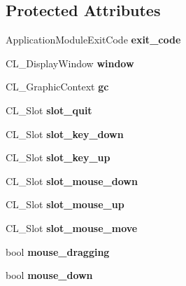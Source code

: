 \subsection*{Protected Attributes}
\begin{DoxyCompactItemize}
\item 
\hypertarget{classApplicationModule_a148d32ab67b53a89631ca60514dac4a6}{
ApplicationModuleExitCode {\bfseries exit\_\-code}}
\label{classApplicationModule_a148d32ab67b53a89631ca60514dac4a6}

\item 
\hypertarget{classApplicationModule_acf67b00ada6051624eab16d1594447e4}{
CL\_\-DisplayWindow {\bfseries window}}
\label{classApplicationModule_acf67b00ada6051624eab16d1594447e4}

\item 
\hypertarget{classApplicationModule_a847a964b766c02650275136054fbf2cf}{
CL\_\-GraphicContext {\bfseries gc}}
\label{classApplicationModule_a847a964b766c02650275136054fbf2cf}

\item 
\hypertarget{classApplicationModule_aeb1efd5a0360aa4b0b631f0ecd73782e}{
CL\_\-Slot {\bfseries slot\_\-quit}}
\label{classApplicationModule_aeb1efd5a0360aa4b0b631f0ecd73782e}

\item 
\hypertarget{classApplicationModule_ae1ec82a52e36716d11cf1ac25d4e81ac}{
CL\_\-Slot {\bfseries slot\_\-key\_\-down}}
\label{classApplicationModule_ae1ec82a52e36716d11cf1ac25d4e81ac}

\item 
\hypertarget{classApplicationModule_a7982a5f4dc5cc214a68646a545df3ea9}{
CL\_\-Slot {\bfseries slot\_\-key\_\-up}}
\label{classApplicationModule_a7982a5f4dc5cc214a68646a545df3ea9}

\item 
\hypertarget{classApplicationModule_aed41a09f76c702164b8f8ebdae86f830}{
CL\_\-Slot {\bfseries slot\_\-mouse\_\-down}}
\label{classApplicationModule_aed41a09f76c702164b8f8ebdae86f830}

\item 
\hypertarget{classApplicationModule_a716f59e33bd1c6b2ec0705428b7b280f}{
CL\_\-Slot {\bfseries slot\_\-mouse\_\-up}}
\label{classApplicationModule_a716f59e33bd1c6b2ec0705428b7b280f}

\item 
\hypertarget{classApplicationModule_abea0d9e41cec16a012776ceb78dd9348}{
CL\_\-Slot {\bfseries slot\_\-mouse\_\-move}}
\label{classApplicationModule_abea0d9e41cec16a012776ceb78dd9348}

\item 
\hypertarget{classApplicationModule_a8a63aa8bea2c7ddb7e24f5ed6c1afb7e}{
bool {\bfseries mouse\_\-dragging}}
\label{classApplicationModule_a8a63aa8bea2c7ddb7e24f5ed6c1afb7e}

\item 
\hypertarget{classApplicationModule_ad12eb054372d029b6fa82218438df1c8}{
bool {\bfseries mouse\_\-down}}
\label{classApplicationModule_ad12eb054372d029b6fa82218438df1c8}

\end{DoxyCompactItemize}


